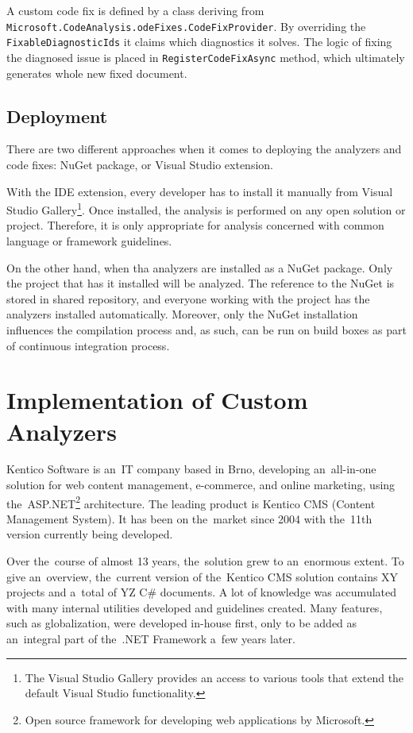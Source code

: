 \documentclass[
  digital, %
  table,   %
  lof,     %
  lot,     %
  oneside,
]{fithesis3}
\begin{document}
A custom code fix is defined by a class deriving from \texttt{Microsoft.CodeAnalysis.odeFixes.CodeFixProvider}. By overriding the \texttt{FixableDiagnosticIds} it claims which diagnostics it solves. The logic of fixing the diagnosed issue is placed in \texttt{RegisterCodeFixAsync} method, which ultimately generates whole new fixed document.

\section{Deployment}
There are two different approaches when it comes to deploying the analyzers and code fixes: NuGet package, or Visual Studio extension. 

With the IDE extension, every developer has to install it manually from Visual Studio Gallery\footnote{The Visual Studio Gallery provides an access to various tools that extend the default Visual Studio functionality.}. Once installed, the analysis is performed on any open solution or project. Therefore, it is only appropriate for analysis concerned with common language or framework guidelines.

On the other hand, when tha analyzers are installed as a NuGet package. Only the project that has it installed will be analyzed. The reference to the NuGet is stored in shared repository, and everyone working with the project has the analyzers installed automatically. Moreover, only the NuGet installation influences the compilation process and, as such, can be run on build boxes as part of continuous integration process.



\chapter{Implementation of Custom Analyzers}
\label{chap:custom-roslyn-analyzers}
Kentico Software is an~IT company based in Brno, developing an~all-in-one solution for web content management, e-commerce, and online marketing, using the~ASP.NET\footnote{Open source framework for developing web applications by Microsoft.} architecture. The leading product is Kentico CMS (Content Management System). It has been on the~market since 2004 with the~11th version currently being developed. 

Over the~course of almost 13 years, the~solution grew to an~enormous extent. To give an~overview, the~current version of the~Kentico CMS solution contains XY projects and a~total of YZ C\# documents. A lot of knowledge was accumulated with many internal utilities developed and guidelines created. Many features, such as globalization, were developed in-house first, only to be added as an~integral part of the~.NET Framework a~few years later.
\end{document}
